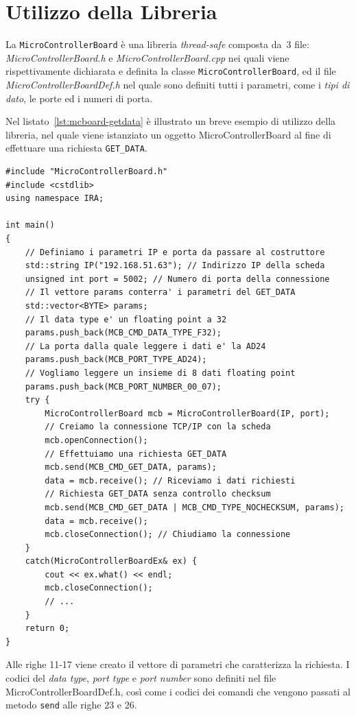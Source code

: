 \section{Utilizzo della Libreria}
La \texttt{MicroControllerBoard} \`e una libreria \emph{thread-safe} composta da~3 file: 
\emph{MicroControllerBoard.h} e \emph{MicroControllerBoard.cpp} nei quali viene rispettivamente
dichiarata e definita la classe \texttt{MicroControllerBoard}, ed il file \emph{MicroControllerBoardDef.h}
nel quale sono definiti tutti i parametri, come i \emph{tipi di dato}, le porte ed i numeri di porta.

Nel listato~\ref{lst:mcboard-getdata} \`e illustrato un breve esempio di utilizzo della
libreria, nel quale viene istanziato un oggetto MicroControllerBoard al fine di 
effettuare una richiesta \texttt{GET\_DATA}.
\lstset{language=C++}
\begin{lstlisting}[caption={[Esempio di utilizzo della libreria \texttt{MicroControllerBoard}]Esempio 
di utilizzo della libreria \texttt{MicroControllerBoard}},
label=lst:mcboard-getdata,mathescape]
#include "MicroControllerBoard.h"
#include <cstdlib>
using namespace IRA;

int main()
{
    // Definiamo i parametri IP e porta da passare al costruttore
    std::string IP("192.168.51.63"); // Indirizzo IP della scheda
    unsigned int port = 5002; // Numero di porta della connessione
    // Il vettore params conterra' i parametri del GET_DATA
    std::vector<BYTE> params;
    // Il data type e' un floating point a 32
    params.push_back(MCB_CMD_DATA_TYPE_F32);
    // La porta dalla quale leggere i dati e' la AD24
    params.push_back(MCB_PORT_TYPE_AD24); 
    // Vogliamo leggere un insieme di 8 dati floating point
    params.push_back(MCB_PORT_NUMBER_00_07);
    try {
        MicroControllerBoard mcb = MicroControllerBoard(IP, port);
        // Creiamo la connessione TCP/IP con la scheda
        mcb.openConnection();
        // Effettuiamo una richiesta GET_DATA
        mcb.send(MCB_CMD_GET_DATA, params);
        data = mcb.receive(); // Riceviamo i dati richiesti
        // Richiesta GET_DATA senza controllo checksum
        mcb.send(MCB_CMD_GET_DATA | MCB_CMD_TYPE_NOCHECKSUM, params);
        data = mcb.receive();
        mcb.closeConnection(); // Chiudiamo la connessione
    }
    catch(MicroControllerBoardEx& ex) {
        cout << ex.what() << endl;
        mcb.closeConnection();
        // ...
    }
    return 0;
}
\end{lstlisting}
\lstset{numbers=none}
Alle righe 11-17 viene creato il vettore di parametri che caratterizza la richiesta. I codici del
\textit{data type}, \textit{port type} e \textit{port number} sono definiti nel file
MicroControllerBoardDef.h, cos\`i come i codici dei comandi che vengono passati al metodo
\texttt{send} alle righe 23 e 26.


